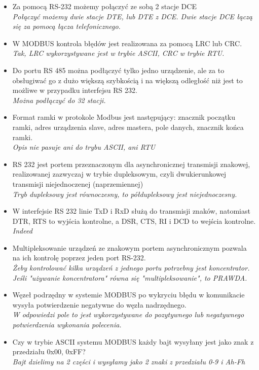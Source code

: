 \begin{itemize}
	\item \textcolor{nie}{Za pomocą RS-232 możemy połączyć ze sobą 2 stacje DCE} \\
	{\small \emph{Połączyć możemy dwie stacje DTE, lub DTE z DCE. Dwie stacje DCE łączą się za pomocą łącza telefonicznego.}}
	
	\item \textcolor{tak}{W MODBUS kontrola błędów jest realizowana za pomocą LRC lub CRC.} \\
	{\small \emph{Tak, LRC wykorzystywane jest w trybie ASCII, CRC w trybie RTU.}}
	
	\item \textcolor{nie}{Do portu RS 485 można podłączyć tylko jedno urządzenie, ale za to obsługiwać go z dużo większą szybkością i na większą odległość niż jest to możliwe w przypadku interfejsu RS 232.} \\
	{\small \emph{Można podłączyć do 32 stacji.}}
	
	\item \textcolor{nie}{Format ramki w protokole Modbus jest następujący: znacznik początku ramki, adres urządzenia slave, adres mastera, pole danych, znacznik końca ramki.} \\
	{\small \emph{Opis nie pasuje ani do trybu ASCII, ani RTU}}
	
	\item \textcolor{nie}{RS 232 jest portem przeznaczonym dla asynchronicznej transmisji znakowej, realizowanej zazwyczaj w trybie dupleksowym, czyli dwukierunkowej transmisji niejednoczenej (naprzemiennej)} \\
	{\small \emph{Tryb dupleksowy jest równoczesny, to półdupleksowy jest niejednoczesny.}}
	
	\item \textcolor{tak}{W interfejsie RS 232 linie TxD i RxD służą do transmisji znaków, natomiast DTR, RTS to wyjścia kontrolne, a DSR, CTS, RI i DCD to wejścia kontrolne.} \\
	{\small \emph{Indeed}}
	
	\item \textcolor{tak}{Multipleksowanie urządzeń ze znakowym portem asynchronicznym pozwala na ich kontrolę poprzez jeden port RS-232.} \\
	{\small \emph{Żeby kontrolować kilka urządzeń z jednego portu potrzebny jest koncentrator. Jeśli "używanie koncentratora" równa się "multipleksowanie", to PRAWDA.}}
	
	\item \textcolor{tak}{Węzeł podrzędny w systemie MODBUS po wykryciu błędu w komunikacie wysyła potwierdzenie negatywne	do węzła nadrzędnego.} \\
	{\small \emph{W odpowiedzi pole to jest wykorzystywane do pozytywnego lub negatywnego potwierdzenia wykonania polecenia.}}
	
	\item \textcolor{tak}{Czy w trybie ASCII systemu MODBUS każdy bajt wysyłany jest jako znak z przedziału 0x00, 0xFF?} \\
	{\small \emph{Bajt dzielimy na 2 części i wysyłamy jako 2 znaki z przedziału 0-9 i Ah-Fh}}
		
	
\end{itemize}


